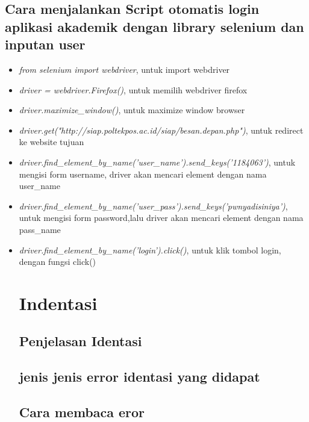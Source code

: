 \documentclass{article}
\begin{document}
\subsection{ Cara menjalankan Script otomatis login aplikasi akademik dengan library selenium dan inputan user}
\begin{itemize}
	\item \textit{from selenium import webdriver}, untuk import webdriver
	\item \textit{driver = webdriver.Firefox()},  untuk memilih webdriver firefox
	\item \textit{driver.maximize\_window()},  untuk maximize window browser
	\item \textit{driver.get("http://siap.poltekpos.ac.id/siap/besan.depan.php")}, untuk redirect ke website tujuan
	\item \textit{driver.find\_element\_by\_name('user\_name').send\_keys('1184063')}, untuk mengisi form username, driver akan mencari element dengan nama user\_name
	\item \textit{driver.find\_element\_by\_name('user\_pass').send\_keys('pwnyadisiniya')}, untuk mengisi form password,lalu driver akan mencari element dengan nama pass\_name
	\item \textit{driver.find\_element\_by\_name('login').click()}, untuk klik tombol login, dengan fungsi click()
	
\section{Indentasi}
\subsection{Penjelasan Identasi }
\usepackage{Indentasi merupakan suatu cara perapihan sintaks atau sebagi aturan dalam Bahasa pemrogaman yang akan ditulis. Indentasi digunakan untuk acuan scope pemrograman dan compiler seperti Bahasa pemrograman python. Indentasi ditandai atau berkaitan dengan kurung kurawal ‘’ untuk memulai atau mengakhiri suatu scope permasalahan. Indentasi sering menjadi suatu kebiasaan atau khas dari seorang programmer. Biasanya indentasi dipakai untuk sekedar memudahkan pembacaan kode program, namun dalam Python,Fungsi indentasi sebagai penanda blok kode program.}

\subsection{ jenis jenis error identasi yang didapat}
\usepackage{script pada spyder tidak sesuai posisi, contohnya penulisan script terlalu menjorok atau penulisan yg kurang menjorok ke dalam }

\subsection{Cara membaca eror}
\usepackage{ untuk mengetahui jenis errornya dapat diketahui melalui IndentitionError: expected an idented block. untuk menghindari error ini bisa menggunakan fungsi if memerlukan identasi untuk membedakannya.}
\end{itemize}
\end{document}
